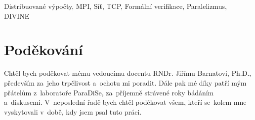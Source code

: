 \documentclass[11pt,twoside,a4paper]{book}
\begin{document}
Distribuované výpočty, MPI, Síť, TCP, Formální verifikace,
Paralelizmus, DIVINE

\cleardoublepage

\section*{Poděkování}

Chtěl bych poděkovat mému vedoucímu docentu RNDr. Jiřímu Barnatovi, Ph.D., především za~jeho trpělivost a~ochotu mi poradit.
Dále pak mé díky patří mým přátelům z~laboratoře ParaDiSe, za~příjemně strávené roky bádáním a~diskusemi.
V~neposlední řadě bych chtěl poděkovat všem, kteří se~kolem mne vyskytovali v~době, kdy jsem psal tuto práci.

\cleardoublepage

\thispagestyle{empty}

\pagestyle{headings}
\tableofcontents
\mainmatter



\appendix




\end{document}

